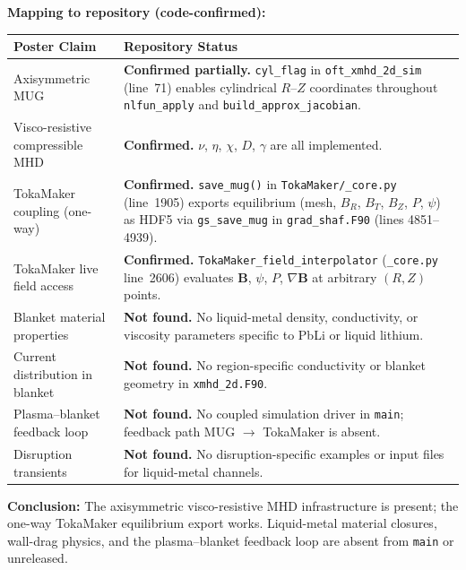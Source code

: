 \documentclass[11pt,letterpaper]{article}
\begin{document}
\textbf{Mapping to repository (code-confirmed):}

\begin{center}
\begin{longtable}{p{}p{}}
\toprule
\textbf{Poster Claim} & \textbf{Repository Status} \\
\midrule
Axisymmetric MUG & \textbf{Confirmed partially.}  \texttt{cyl\_flag} in
  \texttt{oft\_xmhd\_2d\_sim} (line~71) enables cylindrical $R$--$Z$
  coordinates throughout \texttt{nlfun\_apply} and \texttt{build\_approx\_jacobian}. \\
\addlinespace
Visco-resistive compressible MHD & \textbf{Confirmed.} $\nu$, $\eta$, $\chi$,
  $D$, $\gamma$ are all implemented. \\
\addlinespace
TokaMaker coupling (one-way) & \textbf{Confirmed.} \texttt{save\_mug()} in
  \texttt{TokaMaker/\_core.py} (line~1905) exports equilibrium (mesh, $B_R$,
  $B_T$, $B_Z$, $P$, $\psi$) as HDF5 via \texttt{gs\_save\_mug} in
  \texttt{grad\_shaf.F90} (lines 4851--4939). \\
\addlinespace
TokaMaker live field access & \textbf{Confirmed.} \texttt{TokaMaker\_field\_interpolator}
  (\texttt{\_core.py} line~2606) evaluates $\mathbf{B}$, $\psi$, $P$, $\nabla\mathbf{B}$
  at arbitrary $(R,Z)$ points. \\
\addlinespace
Blanket material properties & \textbf{Not found.} No liquid-metal density,
  conductivity, or viscosity parameters specific to PbLi or liquid lithium. \\
\addlinespace
Current distribution in blanket & \textbf{Not found.} No region-specific
  conductivity or blanket geometry in \texttt{xmhd\_2d.F90}. \\
\addlinespace
Plasma--blanket feedback loop & \textbf{Not found.} No coupled simulation
  driver in \texttt{main}; feedback path MUG $\to$ TokaMaker is absent. \\
\addlinespace
Disruption transients & \textbf{Not found.} No disruption-specific examples or
  input files for liquid-metal channels. \\
\bottomrule
\end{longtable}
\end{center}

\textbf{Conclusion:} The axisymmetric visco-resistive MHD infrastructure is
present; the one-way TokaMaker equilibrium export works.  Liquid-metal
material closures, wall-drag physics, and the plasma--blanket feedback loop
are absent from \texttt{main} or unreleased.
\end{document}
